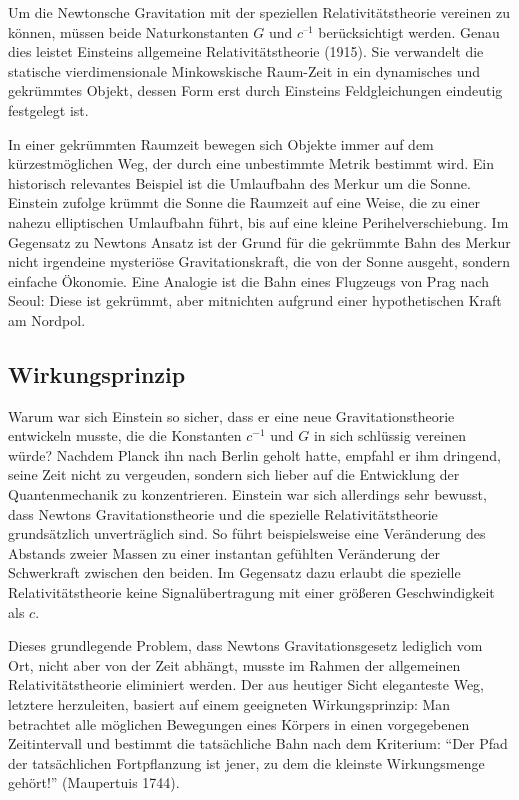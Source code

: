
\newpage {}
\label{sec:1100}

Um die Newtonsche Gravitation mit der speziellen Relativitätstheorie vereinen zu können, müssen beide Naturkonstanten $G$ und $c^{–1}$ berücksichtigt werden. Genau dies leistet Einsteins allgemeine Relativitätstheorie (1915). Sie verwandelt die statische vierdimensionale Minkowskische Raum-Zeit in ein dynamisches und gekrümmtes Objekt, dessen Form erst durch Einsteins Feldgleichungen eindeutig festgelegt ist.

In einer gekrümmten Raumzeit bewegen sich Objekte immer auf dem kürzestmöglichen Weg, der durch eine unbestimmte Metrik bestimmt wird. Ein historisch relevantes Beispiel ist die Umlaufbahn des Merkur um die Sonne. Einstein zufolge krümmt die Sonne die Raumzeit auf eine Weise, die zu einer nahezu elliptischen Umlaufbahn führt, bis auf eine kleine Perihelverschiebung. Im Gegensatz zu Newtons Ansatz ist der Grund für die gekrümmte Bahn des Merkur nicht irgendeine mysteriöse Gravitationskraft, die von der Sonne ausgeht, sondern einfache Ökonomie. Eine Analogie ist die Bahn eines Flugzeugs von Prag nach Seoul: Diese ist gekrümmt, aber mitnichten aufgrund einer hypothetischen Kraft am Nordpol.


\subsection*{Wirkungsprinzip}

Warum war sich Einstein so sicher, dass er eine neue Gravitationstheorie entwickeln musste, die die Konstanten $c^{−1}$ und $G$ in sich schlüssig vereinen würde? Nachdem Planck ihn nach Berlin geholt hatte, empfahl er ihm dringend, seine Zeit nicht zu vergeuden, sondern sich lieber auf die Entwicklung der Quantenmechanik zu konzentrieren. Einstein war sich allerdings sehr bewusst, dass Newtons Gravitationstheorie und die spezielle Relativitätstheorie grundsätzlich unverträglich sind. So führt beispielsweise eine Veränderung des Abstands zweier Massen zu einer instantan gefühlten Veränderung der Schwerkraft zwischen den beiden. Im Gegensatz dazu erlaubt die spezielle Relativitätstheorie keine Signalübertragung mit einer größeren Geschwindigkeit als $c$.

Dieses grundlegende Problem, dass Newtons Gravitationsgesetz lediglich vom Ort, nicht aber von der Zeit abhängt, musste im Rahmen der allgemeinen Relativitätstheorie eliminiert werden. Der aus heutiger Sicht eleganteste Weg, letztere herzuleiten, basiert auf einem geeigneten Wirkungsprinzip: Man betrachtet alle möglichen Bewegungen eines Körpers in einen vorgegebenen Zeitintervall und bestimmt die tatsächliche Bahn nach dem Kriterium: \enquote{Der Pfad der tatsächlichen Fortpflanzung ist jener, zu dem die kleinste Wirkungsmenge gehört!} (Maupertuis 1744).


